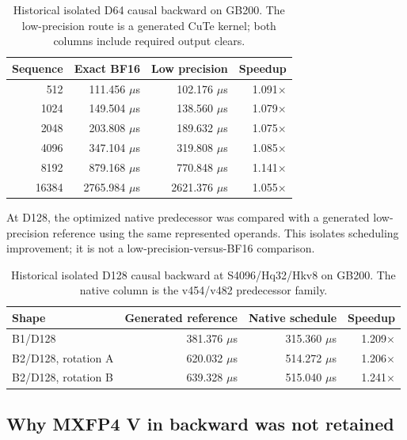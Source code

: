 \begin{table}[htbp]
\centering
\caption{Historical isolated D64 causal backward on GB200.  The low-precision
route is a generated CuTe kernel; both columns include required output clears.}
\label{tab:d64-bf16-sweep}
\small
\begin{tabular}{rrrr}
\toprule
Sequence & Exact BF16 & Low precision & Speedup \\
\midrule
512   & 111.456 $\mu$s  & 102.176 $\mu$s  & 1.091$\times$ \\
1024  & 149.504 $\mu$s  & 138.560 $\mu$s  & 1.079$\times$ \\
2048  & 203.808 $\mu$s  & 189.632 $\mu$s  & 1.075$\times$ \\
4096  & 347.104 $\mu$s  & 319.808 $\mu$s  & 1.085$\times$ \\
8192  & 879.168 $\mu$s  & 770.848 $\mu$s  & 1.141$\times$ \\
16384 & 2765.984 $\mu$s & 2621.376 $\mu$s & 1.055$\times$ \\
\bottomrule
\end{tabular}
\end{table}
\FloatBarrier

At D128, the optimized native predecessor was compared with a generated
low-precision reference using the same represented operands.  This isolates
scheduling improvement; it is not a low-precision-versus-BF16 comparison.

\begin{table}[htbp]
\centering
\caption{Historical isolated D128 causal backward at S4096/Hq32/Hkv8 on
GB200.  The native column is the v454/v482 predecessor family.}
\label{tab:causal-backward-results}
\small
\begin{tabular}{lrrr}
\toprule
Shape & Generated reference & Native schedule & Speedup \\
\midrule
B1/D128 & 381.376 $\mu$s & 315.360 $\mu$s & 1.209$\times$ \\
B2/D128, rotation A & 620.032 $\mu$s & 514.272 $\mu$s & 1.206$\times$ \\
B2/D128, rotation B & 639.328 $\mu$s & 515.040 $\mu$s & 1.241$\times$ \\
\bottomrule
\end{tabular}
\end{table}
\FloatBarrier

\subsection{Why MXFP4 V in backward was not retained}

